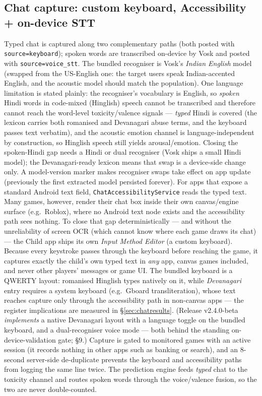 \documentclass[11pt,a4paper]{article}
\begin{document}
\subsection{Chat capture: custom keyboard, Accessibility + on-device STT}
Typed chat is captured along two complementary paths (both posted with
\texttt{source=keyboard}); spoken words are transcribed on-device by Vosk and posted
with \texttt{source=voice\_stt}. The bundled recogniser is Vosk's \emph{Indian
English} model (swapped from the US-English one: the target users speak
Indian-accented English, and the acoustic model should match the population). One
language limitation is stated plainly: the recogniser's vocabulary is English, so
\emph{spoken} Hindi words in code-mixed (Hinglish) speech cannot be transcribed and
therefore cannot reach the word-level toxicity/valence signals --- \emph{typed}
Hindi is covered (the lexicon carries both romanised and Devanagari abuse terms, and
the keyboard passes text verbatim), and the acoustic emotion channel is
language-independent by construction, so Hinglish speech still yields
arousal/emotion. Closing the spoken-Hindi gap needs a Hindi or dual recogniser
(Vosk ships a small Hindi model); the Devanagari-ready lexicon means that swap is a
device-side change only. A model-version marker makes recogniser swaps take effect
on app update (previously the first extracted model persisted forever). For apps that expose a standard Android text field,
\texttt{ChatAccessibilityService} reads the typed text. Many games, however, render
their chat box inside their own canvas/engine surface (e.g.\ Roblox), where no Android
text node exists and the accessibility path sees nothing. To close that gap
deterministically --- and without the unreliability of screen OCR (which cannot know
where each game draws its chat) --- the Child app ships its own \emph{Input Method
Editor} (a custom keyboard). Because every keystroke passes through the keyboard before
reaching the game, it captures exactly the child's own typed text in \emph{any} app,
canvas games included, and never other players' messages or game UI. The bundled
keyboard is a QWERTY layout: romanised Hinglish types natively on it, while
\emph{Devanagari} entry requires a system keyboard (e.g.\ Gboard transliteration),
whose text reaches capture only through the accessibility path in
non-canvas apps --- the register implications are measured in
\S\ref{sec:chatresults}. (Release v2.4.0-beta \emph{implements} a native
Devanagari layout with a language toggle on the bundled keyboard, and a
dual-recogniser voice mode --- both behind the standing on-device-validation
gate; \S9.) Capture is gated to
monitored games with an active session (it records nothing in other apps such as banking
or search), and an 8-second server-side de-duplicate prevents the keyboard and
accessibility paths from logging the same line twice. The prediction engine feeds
\emph{typed} chat to the toxicity channel and routes spoken words through the
voice/valence fusion, so the two are never double-counted.
\end{document}
